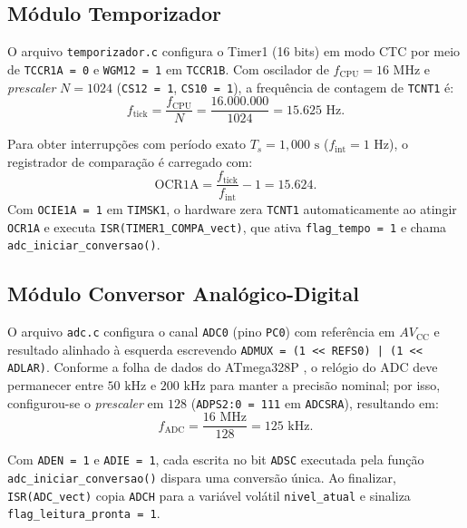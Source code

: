 \documentclass[conference]{IEEEtran}
\begin{document}
\subsection{Módulo Temporizador}
O arquivo \texttt{temporizador.c} configura o Timer1 (16 bits) em modo CTC por meio de \texttt{TCCR1A = 0} e \texttt{WGM12 = 1} em \texttt{TCCR1B}. Com oscilador de $f_{\text{CPU}} = 16\text{ MHz}$ e \textit{prescaler} $N = 1024$ (\texttt{CS12 = 1}, \texttt{CS10 = 1}), a frequência de contagem de \texttt{TCNT1} é:
\begin{equation}
	f_{\text{tick}} = \frac{f_{\text{CPU}}}{N} = \frac{16{.}000{.}000}{1024} = 15{.}625\text{ Hz}.
	\label{eq:timer_freq}
\end{equation}

Para obter interrupções com período exato $T_s = 1{,}000\text{ s}$ ($f_{\text{int}} = 1\text{ Hz}$), o registrador de comparação é carregado com:
\begin{equation}
	\text{OCR1A} = \frac{f_{\text{tick}}}{f_{\text{int}}} - 1 = 15{.}624.
	\label{eq:ocr1a}
\end{equation}
Com \texttt{OCIE1A = 1} em \texttt{TIMSK1}, o hardware zera \texttt{TCNT1} automaticamente ao atingir \texttt{OCR1A} e executa \texttt{ISR(TIMER1\_COMPA\_vect)}, que ativa \texttt{flag\_tempo = 1} e chama \texttt{adc\_iniciar\_conversao()}.

\subsection{Módulo Conversor Analógico-Digital}
O arquivo \texttt{adc.c} configura o canal \texttt{ADC0} (pino \texttt{PC0}) com referência em $AV_{\text{CC}}$ e resultado alinhado à esquerda escrevendo \texttt{ADMUX = (1 <{<} REFS0) | (1 <{<} ADLAR)}. Conforme a folha de dados do ATmega328P \cite{ref_atmel}, o relógio do ADC deve permanecer entre $50\text{ kHz}$ e $200\text{ kHz}$ para manter a precisão nominal; por isso, configurou-se o \textit{prescaler} em $128$ (\texttt{ADPS2:0 = 111} em \texttt{ADCSRA}), resultando em:
\begin{equation}
	f_{\text{ADC}} = \frac{16\text{ MHz}}{128} = 125\text{ kHz}.
	\label{eq:adc_clk}
\end{equation}

Com \texttt{ADEN = 1} e \texttt{ADIE = 1}, cada escrita no bit \texttt{ADSC} executada pela função \texttt{adc\_iniciar\_conversao()} dispara uma conversão única. Ao finalizar, \texttt{ISR(ADC\_vect)} copia \texttt{ADCH} para a variável volátil \texttt{nivel\_atual} e sinaliza \texttt{flag\_leitura\_pronta = 1}.
\end{document}
